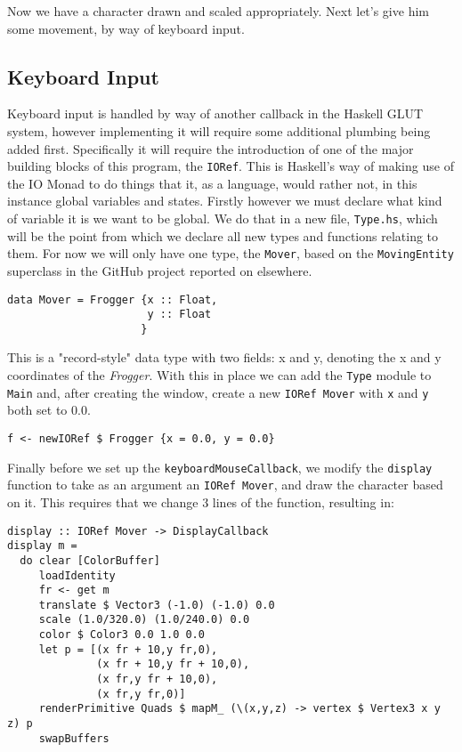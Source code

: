 \documentclass[12pt, a4paper]{report}
\begin{document}
Now we have a character drawn and scaled appropriately.
Next let's give him some movement, by way of keyboard input.

\subsection{Keyboard Input}

Keyboard input is handled by way of another callback in the Haskell GLUT system, however implementing it will require some additional plumbing being added first.
Specifically it will require the introduction of one of the major building blocks of this program, the \verb|IORef|.
This is Haskell's way of making use of the IO Monad to do things that it, as a language, would rather not, in this instance global variables and states.
Firstly however we must declare what kind of variable it is we want to be global.
We do that in a new file, \verb|Type.hs|, which will be the point from which we declare all new types and functions relating to them.
For now we will only have one type, the \verb|Mover|, based on the \verb|MovingEntity| superclass in the GitHub project reported on elsewhere.

\begin{lstlisting}
data Mover = Frogger {x :: Float,
                      y :: Float
                     }
\end{lstlisting}

This is a "record-style" data type with two fields: x and y, denoting the x and y coordinates of the \textit{Frogger}.
With this in place we can add the \verb|Type| module to \verb|Main| and, after creating the window, create a new \verb|IORef Mover| with \verb|x| and \verb|y| both set to 0.0.

\begin{lstlisting}
f <- newIORef $ Frogger {x = 0.0, y = 0.0}
\end{lstlisting}

Finally before we set up the \verb|keyboardMouseCallback|, we modify the \verb|display| function to take as an argument an \verb|IORef Mover|, and draw the character based on it.
This requires that we change 3 lines of the function, resulting in:

\begin{lstlisting}[xleftmargin=-0.1\textwidth, xrightmargin=-0.1\textwidth]
display :: IORef Mover -> DisplayCallback
display m =
  do clear [ColorBuffer]
     loadIdentity
     fr <- get m
     translate $ Vector3 (-1.0) (-1.0) 0.0
     scale (1.0/320.0) (1.0/240.0) 0.0
     color $ Color3 0.0 1.0 0.0
     let p = [(x fr + 10,y fr,0),
              (x fr + 10,y fr + 10,0),
              (x fr,y fr + 10,0),
              (x fr,y fr,0)]
     renderPrimitive Quads $ mapM_ (\(x,y,z) -> vertex $ Vertex3 x y z) p
     swapBuffers
\end{lstlisting}
\end{document}
